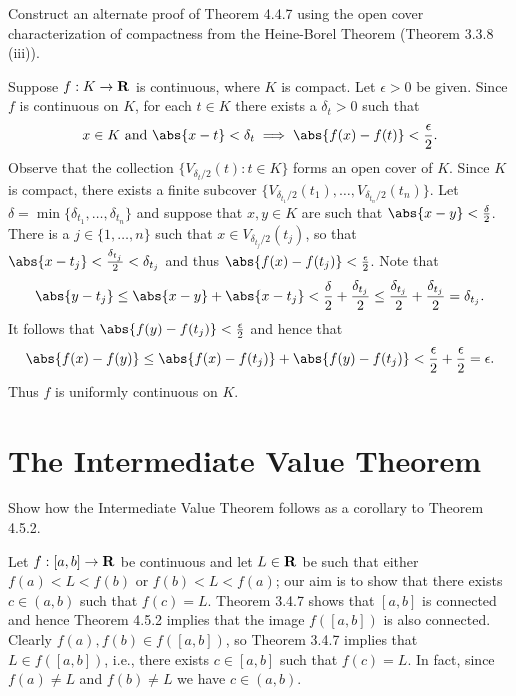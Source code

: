 \documentclass{lew98_solutions}
\begin{document}
\begin{exercise}
\label{ex:4.4.14}
    Construct an alternate proof of Theorem 4.4.7 using the open cover characterization of compactness from the Heine-Borel Theorem (Theorem 3.3.8 (iii)).
\end{exercise}

\begin{solution}
    Suppose \( f : K \to \mathbf{R} \) is continuous, where \( K \) is compact. Let \( \epsilon > 0 \) be given. Since \( f \) is continuous on \( K \), for each \( t \in K \) there exists a \( \delta_t > 0 \) such that
    \[
        x \in K \text{ and } \abs{x - t} < \delta_t \implies \abs{f(x) - f(t)} < \frac{\epsilon}{2}.
    \]
    Observe that the collection \( \{ V_{\delta_t/2}(t) : t \in K \} \) forms an open cover of \( K \). Since \( K \) is compact, there exists a finite subcover \( \{ V_{\delta_{t_1}/2}(t_1), \ldots, V_{\delta_{t_n}/2}(t_n) \} \). Let \( \delta = \min \{ \delta_{t_1}, \ldots, \delta_{t_n} \} \) and suppose that \( x, y \in K \) are such that \( \abs{x - y} < \frac{\delta}{2} \). There is a \( j \in \{ 1, \ldots, n \} \) such that \( x \in V_{\delta_{t_j}/2}(t_j) \), so that \( \abs{x - t_j} < \frac{\delta_{t_j}}{2} < \delta_{t_j} \) and thus \( \abs{f(x) - f(t_j)} < \tfrac{\epsilon}{2} \). Note that
    \[
        \abs{y - t_j} \leq \abs{x - y} + \abs{x - t_j} < \frac{\delta}{2} + \frac{\delta_{t_j}}{2} \leq \frac{\delta_{t_j}}{2} + \frac{\delta_{t_j}}{2} = \delta_{t_j}.
    \]
    It follows that \( \abs{f(y) - f(t_j)} < \tfrac{\epsilon}{2} \) and hence that
    \[
        \abs{f(x) - f(y)} \leq \abs{f(x) - f(t_j)} + \abs{f(y) - f(t_j)} < \frac{\epsilon}{2} + \frac{\epsilon}{2} = \epsilon.
    \]
    Thus \( f \) is uniformly continuous on \( K \).
\end{solution}

\section{The Intermediate Value Theorem}
\label{sec:4.5}

\begin{exercise}
\label{ex:4.5.1}
    Show how the Intermediate Value Theorem follows as a corollary to Theorem 4.5.2.
\end{exercise}

\begin{solution}
    Let \( f : [a, b] \to \mathbf{R} \) be continuous and let \( L \in \mathbf{R} \) be such that either \( f(a) < L < f(b) \) or \( f(b) < L < f(a) \); our aim is to show that there exists \( c \in (a, b) \) such that \( f(c) = L \). Theorem 3.4.7 shows that \( [a, b] \) is connected and hence Theorem 4.5.2 implies that the image \( f([a, b]) \) is also connected. Clearly \( f(a), f(b) \in f([a, b]) \), so Theorem 3.4.7 implies that \( L \in f([a, b]) \), i.e., there exists \( c \in [a, b] \) such that \( f(c) = L \). In fact, since \( f(a) \neq L \) and \( f(b) \neq L \) we have \( c \in (a, b) \).
\end{solution}
\end{document}
